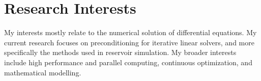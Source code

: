\documentclass[11pt,a4paper,roman]{moderncv} %
\begin{document}


%
%
%
%
%


\makecvtitle %




\section{Research Interests}
My interests mostly relate to the numerical solution of differential equations. My current research focuses on preconditioning for iterative linear solvers, and more specifically the methods used in reservoir simulation. My broader interests include high performance and parallel computing, continuous optimization, and mathematical modelling.


\end{document}
